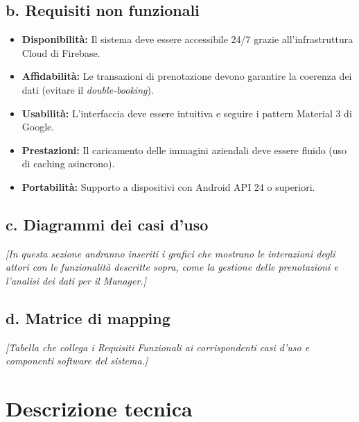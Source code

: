 \documentclass[12pt]{article}
\begin{document}
\subsection{b. Requisiti non funzionali}
\begin{itemize}
    \item \textbf{Disponibilità:} Il sistema deve essere accessibile 24/7 grazie all'infrastruttura Cloud di Firebase.
    \item \textbf{Affidabilità:} Le transazioni di prenotazione devono garantire la coerenza dei dati (evitare il \textit{double-booking}).
    \item \textbf{Usabilità:} L'interfaccia deve essere intuitiva e seguire i pattern Material 3 di Google.
    \item \textbf{Prestazioni:} Il caricamento delle immagini aziendali deve essere fluido (uso di caching asincrono).
    \item \textbf{Portabilità:} Supporto a dispositivi con Android API 24 o superiori.
\end{itemize}

\subsection{c. Diagrammi dei casi d’uso}
\textit{[In questa sezione andranno inseriti i grafici che mostrano le interazioni degli attori con le funzionalità descritte sopra, come la gestione delle prenotazioni e l'analisi dei dati per il Manager.]}

\subsection{d. Matrice di mapping}
\textit{[Tabella che collega i Requisiti Funzionali ai corrispondenti casi d'uso e componenti software del sistema.]}

\newpage
\section{Descrizione tecnica}
\end{document}
